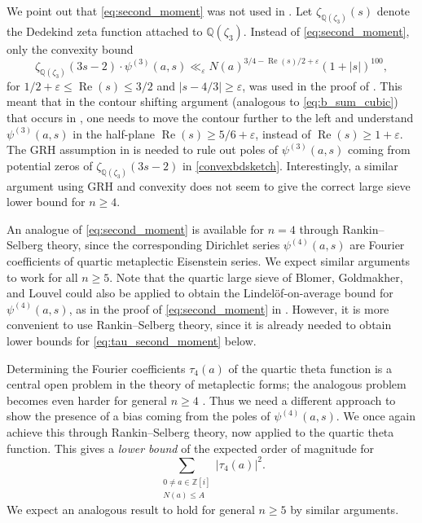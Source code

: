 \documentclass[12pt,reqno]{amsart}
\numberwithin{equation}{section}
\renewcommand{\Re}{\operatorname{Re}}
\newcommand{\Q}{\mathbb{Q}}
\begin{document}
We point out that \eqref{eq:second_moment} was not used in \cite{DR}. 
Let $\zeta_{\Q(\zeta_3)}(s)$ denote the Dedekind zeta function attached to $\Q(\zeta_3)$.
Instead of \eqref{eq:second_moment}, only the convexity bound \cite[(6.13)]{DDDS24}
\begin{equation} \label{convexbdsketch}
\zeta_{\Q(\zeta_3)}(3s-2) \cdot \psi^{(3)}(a,s) \ll_\varepsilon N(a)^{3/4-\Re(s)/2+\varepsilon} (1+|s|)^{100},
\end{equation}
for $1/2+\varepsilon \leq \Re(s) \leq 3/2$ and $|s-4/3| \geq \varepsilon$, was used in the proof of \cite[Theorem~1.4]{DR}. This meant that 
in the contour shifting argument (analogous to \eqref{eq:b_sum_cubic}) that occurs in \cite{DR}, one needs to move the contour further to the left and understand $\psi^{(3)}(a,s)$ in the half-plane $\Re(s) \geq 5/6+\varepsilon$, instead of $\Re(s) \geq 1+\varepsilon$. The GRH assumption in \cite[Theorem~1.4]{DR}
is needed to rule out poles of $\psi^{(3)}(a, s)$ coming from potential zeros of $\zeta_{\Q(\zeta_3)}(3s-2)$ in \eqref{convexbdsketch}. Interestingly, a similar argument using GRH and convexity does not seem to give the correct large sieve lower bound for $n\geq 4$.

An analogue of \eqref{eq:second_moment} is available for $n=4$ through Rankin--Selberg theory, since the corresponding Dirichlet series $\psi^{(4)}(a,s)$
 are Fourier coefficients of quartic metaplectic Eisenstein series. We expect similar arguments to work for all $n \geq 5$.
Note that the quartic large sieve of Blomer, Goldmakher, and Louvel \cite[Theorem~1.3]{BGL} could also be applied to obtain the Lindel\"{o}f-on-average bound for $\psi^{(4)}(a,s)$, as in the proof of \eqref{eq:second_moment} in \cite[Lemma 6.6]{DDDS24}.
However, it is more convenient to use Rankin--Selberg theory, since it is already needed to obtain lower bounds for \eqref{eq:tau_second_moment} below.

Determining the Fourier coefficients $\tau_4(a)$ of the quartic theta function is a central open problem in the theory of metaplectic forms; the analogous problem becomes even harder for general $n \geq 4$ \cite{BH,Deli,EckPat,KP,Pat2}. Thus we need a different approach to show the presence of a bias coming from the poles of $\psi^{(4)}(a,s)$. We once again achieve this through Rankin--Selberg theory, now applied to the quartic theta function. This gives a \emph{lower bound} of the expected order of magnitude for
\begin{equation}\label{eq:tau_second_moment}
    \sum_{\substack{0 \neq a \in \mathbb{Z}[i] \\ N(a) \leq A}} |{\tau_4(a)}|^2.
\end{equation}
We expect an analogous result to hold for general $n \geq 5$ by similar arguments.
\end{document}
